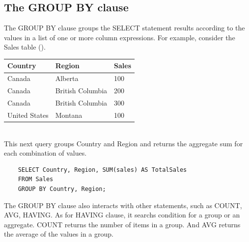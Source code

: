 \documentclass[10pt,a4paper]{article}
\begin{document}
\subsection{The GROUP BY clause}
The GROUP BY clause groups the SELECT statement results according to the values in a list of one or more column expressions. For example, consider the Sales table ().\\
\begin{tabular}{|l|l|l|}
	\hline 
	\textbf{Country} & \textbf{Region} & \textbf{Sales} \\ 
	\hline 
	Canada & Alberta & 100 \\ 
	\hline 
	Canada & British Columbia & 200 \\ 
	\hline 
	Canada & British Columbia & 300 \\ 
	\hline 
	United States & Montana & 100 \\ 
	\hline 
	\end{tabular} \\
This next query groups Country and Region and returns the aggregate sum for each combination of values. 
\begin{lstlisting}
	SELECT Country, Region, SUM(sales) AS TotalSales
	FROM Sales
	GROUP BY Country, Region;
	\end{lstlisting}
The GROUP BY clause also interacts with other statements, such as COUNT, AVG, HAVING. As for HAVING clause, it searchs condition for a group or an aggregate. COUNT returns the number of items in a group. And AVG returns the average of the values in a group. 
\end{document}
